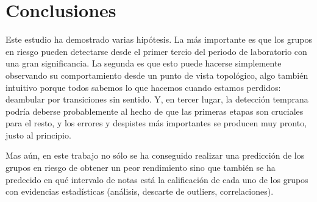 \chapter{Conclusiones}\label{sec:chapterXIV}

Este estudio ha demostrado varias hipótesis. La más importante es que los grupos en riesgo pueden detectarse desde el primer tercio del periodo de laboratorio con una gran significancia. La segunda es que esto puede hacerse simplemente observando su comportamiento desde un punto de vista topológico, algo también intuitivo porque todos sabemos lo que hacemos cuando estamos perdidos: deambular por transiciones sin sentido. Y, en tercer lugar, la detección temprana podría deberse probablemente al hecho de que las primeras etapas son cruciales para el resto, y los errores y despistes más importantes se producen muy pronto, justo al principio.

Mas aún, en este trabajo no sólo se ha conseguido realizar una predicción de los grupos en riesgo de obtener un peor rendimiento sino que también se ha predecido en qué intervalo de notas está la calificación de cada uno de los grupos con evidencias estadísticas (análisis, descarte de outliers, correlaciones).